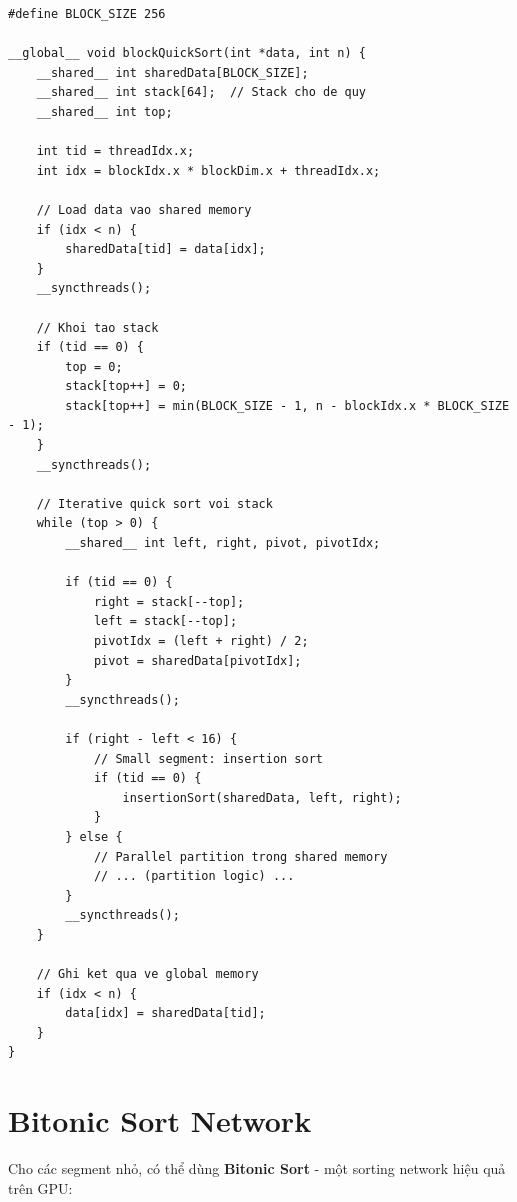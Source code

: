 \begin{lstlisting}[caption={Block Quick Sort với Shared Memory}, label={lst:block_quicksort}]
#define BLOCK_SIZE 256

__global__ void blockQuickSort(int *data, int n) {
    __shared__ int sharedData[BLOCK_SIZE];
    __shared__ int stack[64];  // Stack cho de quy
    __shared__ int top;
    
    int tid = threadIdx.x;
    int idx = blockIdx.x * blockDim.x + threadIdx.x;
    
    // Load data vao shared memory
    if (idx < n) {
        sharedData[tid] = data[idx];
    }
    __syncthreads();
    
    // Khoi tao stack
    if (tid == 0) {
        top = 0;
        stack[top++] = 0;
        stack[top++] = min(BLOCK_SIZE - 1, n - blockIdx.x * BLOCK_SIZE - 1);
    }
    __syncthreads();
    
    // Iterative quick sort voi stack
    while (top > 0) {
        __shared__ int left, right, pivot, pivotIdx;
        
        if (tid == 0) {
            right = stack[--top];
            left = stack[--top];
            pivotIdx = (left + right) / 2;
            pivot = sharedData[pivotIdx];
        }
        __syncthreads();
        
        if (right - left < 16) {
            // Small segment: insertion sort
            if (tid == 0) {
                insertionSort(sharedData, left, right);
            }
        } else {
            // Parallel partition trong shared memory
            // ... (partition logic) ...
        }
        __syncthreads();
    }
    
    // Ghi ket qua ve global memory
    if (idx < n) {
        data[idx] = sharedData[tid];
    }
}
\end{lstlisting}

\section{Bitonic Sort Network}

Cho các segment nhỏ, có thể dùng \textbf{Bitonic Sort} - một sorting network hiệu quả trên GPU:

